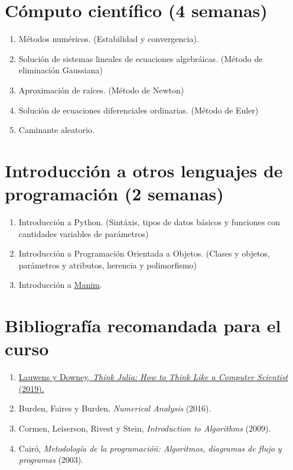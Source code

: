 \documentclass[a4paper]{article}
\begin{document}
\section{Cómputo científico (4 semanas)} \label{Sec: Cómputo científico: construcción de pseudocódigo e implementación en código (4 semanas)}

\begin{enumerate}[label=\arabic*.]

    \item Métodos numéricos. (Estabilidad y convergencia).
    \item Solución de sistemas lineales de ecuaciones algebráicas. (Método de eliminación Gaussiana)
    \item Aproximación de raíces. (Método de Newton)
    \item Solución de ecuaciones diferenciales ordinarias. (Método de Euler)
    \item Caminante aleatorio.
\end{enumerate}

\section{Introducción a otros lenguajes de programación (2 semanas)} \label{Sec: Introducción a otros lenguajes de programación (2 semana)}

\begin{enumerate}[label=\arabic*.]

    \item Introducción a Python. (Sintáxis, tipos de datos básicos y funciones con cantidades variables de parámetros)

    \item Introducción a Programación Orientada a Objetos. (Clases y objetos, parámetros y atributos, herencia y polimorfismo)

    \item Introducción a \href{https://www.manim.community/}{Manim}.
\end{enumerate}

\section*{Bibliografía recomandada para el curso} \label{Sec: Bibliografía}

\begin{enumerate}

    \item \href{https://benlauwens.github.io/ThinkJulia.jl/latest/book.html}{Lauwens y Downey, \emph{Think Julia: How to Think Like a Computer Scientist} (2019).}

    \item Burden, Faires y Burden, \emph{Numerical Analysis} (2016).

    \item Cormen, Leiserson, Rivest y Stein, \emph{Introduction to Algorithms} (2009).

    \item Cairó, \emph{Metodología de la programacióñ: Algoritmos, diagramas de flujo y programas} (2003).
\end{enumerate}
\end{document}
